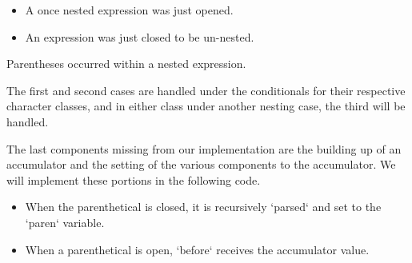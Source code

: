\begin{itemize}
  \item A once nested expression was just opened.
  \item An expression was just closed to be un-nested.
\end{itemize}
 Parentheses occurred within a nested expression.

The first and second cases are handled under the conditionals for their respective 
character classes, and in either class under another nesting case, the third will be 
handled.

The last components missing from our implementation are the building up of an 
accumulator and the setting of the various components to the accumulator. We will 
implement these portions in the following code.

\begin{itemize}
  \item When the parenthetical is closed, it is recursively `parsed` and set to the `paren` variable.
  \item When a parenthetical is open, `before` receives the accumulator value.
\end{itemize}

